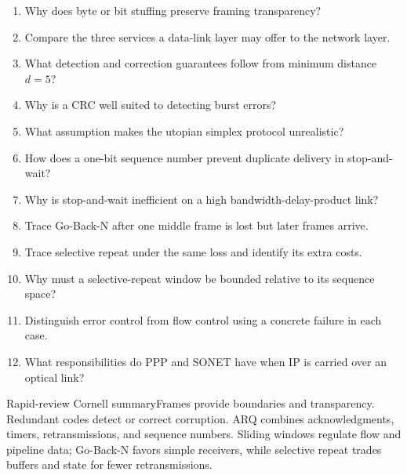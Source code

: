 \documentclass[10pt,letterpaper]{article}
\begin{document}

\begin{enumerate}
  \item Why does byte or bit stuffing preserve framing transparency?
  \item Compare the three services a data-link layer may offer to the network layer.
  \item What detection and correction guarantees follow from minimum distance $d=5$?
  \item Why is a CRC well suited to detecting burst errors?
  \item What assumption makes the utopian simplex protocol unrealistic?
  \item How does a one-bit sequence number prevent duplicate delivery in stop-and-wait?
  \item Why is stop-and-wait inefficient on a high bandwidth-delay-product link?
  \item Trace Go-Back-N after one middle frame is lost but later frames arrive.
  \item Trace selective repeat under the same loss and identify its extra costs.
  \item Why must a selective-repeat window be bounded relative to its sequence space?
  \item Distinguish error control from flow control using a concrete failure in each case.
  \item What responsibilities do PPP and SONET have when IP is carried over an optical link?
\end{enumerate}
\begin{CornellSummaryBox}{Rapid-review Cornell summary}Frames provide boundaries and transparency. Redundant codes detect or correct corruption. ARQ combines acknowledgments, timers, retransmissions, and sequence numbers. Sliding windows regulate flow and pipeline data; Go-Back-N favors simple receivers, while selective repeat trades buffers and state for fewer retransmissions.\end{CornellSummaryBox}
\end{document}
